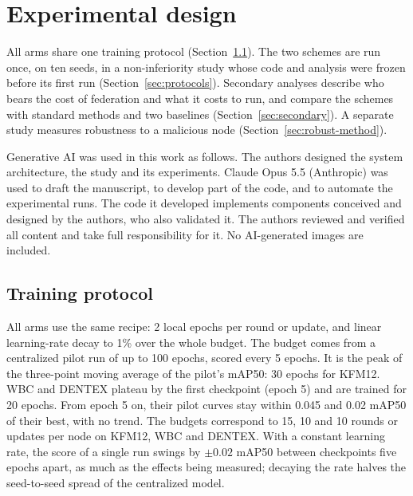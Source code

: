 \documentclass[pdflatex,sn-mathphys-num]{sn-jnl}
\begin{document}
\section{Experimental design}\label{sec:design}

All arms share one training protocol (Section~\ref{sec:protocol}). The two schemes are run once, on ten seeds, in a non-inferiority study whose code and analysis were frozen before its first run (Section~\ref{sec:protocols}). Secondary analyses describe who bears the cost of federation and what it costs to run, and compare the schemes with standard methods and two baselines (Section~\ref{sec:secondary}). A separate study measures robustness to a malicious node (Section~\ref{sec:robust-method}).

Generative AI was used in this work as follows. The authors designed the system architecture, the study and its experiments. Claude Opus 5.5 (Anthropic) was used to draft the manuscript, to develop part of the code, and to automate the experimental runs. The code it developed implements components conceived and designed by the authors, who also validated it. The authors reviewed and verified all content and take full responsibility for it. No AI-generated images are included.

\subsection{Training protocol}\label{sec:protocol}
All arms use the same recipe: 2 local epochs per round or update, and linear learning-rate decay to 1\% over the whole budget. The budget comes from a centralized pilot run of up to 100 epochs, scored every 5 epochs. It is the peak of the three-point moving average of the pilot's mAP50: 30 epochs for KFM12. WBC and DENTEX plateau by the first checkpoint (epoch 5) and are trained for 20 epochs. From epoch 5 on, their pilot curves stay within 0.045 and 0.02 mAP50 of their best, with no trend. The budgets correspond to 15, 10 and 10 rounds or updates per node on KFM12, WBC and DENTEX. With a constant learning rate, the score of a single run swings by $\pm0.02$ mAP50 between checkpoints five epochs apart, as much as the effects being measured; decaying the rate halves the seed-to-seed spread of the centralized model.
\end{document}
